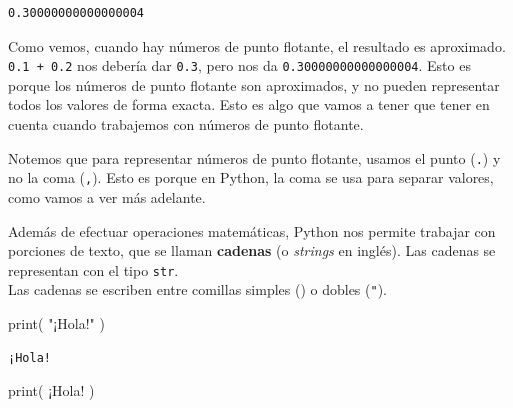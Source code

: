 \documentclass[
  letterpaper,
  DIV=11,
  numbers=noendperiod]{scrreprt}
\newenvironment{Shaded}{\begin{snugshade}}{\end{snugshade}}
\newcommand{\BuiltInTok}[1]{\textcolor[rgb]{0.00,0.23,0.31}{#1}}
\newcommand{\NormalTok}[1]{\textcolor[rgb]{0.00,0.23,0.31}{#1}}
\newcommand{\StringTok}[1]{\textcolor[rgb]{0.13,0.47,0.30}{#1}}
\begin{document}
\begin{verbatim}
0.30000000000000004
\end{verbatim}

Como vemos, cuando hay números de punto flotante, el resultado es
aproximado. \texttt{0.1\ +\ 0.2} nos debería dar \texttt{0.3}, pero nos
da \texttt{0.30000000000000004}. Esto es porque los números de punto
flotante son aproximados, y no pueden representar todos los valores de
forma exacta. Esto es algo que vamos a tener que tener en cuenta cuando
trabajemos con números de punto flotante.

\begin{tcolorbox}[enhanced jigsaw, bottomrule=.15mm, leftrule=.75mm, opacityback=0, colback=white, toprule=.15mm, bottomtitle=1mm, opacitybacktitle=0.6, rightrule=.15mm, left=2mm, arc=.35mm, coltitle=black, title=\textcolor{quarto-callout-note-color}{\faInfo}\hspace{0.5em}{Uso de punto}, breakable, toptitle=1mm, colframe=quarto-callout-note-color-frame, titlerule=0mm, colbacktitle=quarto-callout-note-color!10!white]

Notemos que para representar números de punto flotante, usamos el punto
(\texttt{.}) y no la coma (\texttt{,}). Esto es porque en Python, la
coma se usa para separar valores, como vamos a ver más adelante.

\end{tcolorbox}

Además de efectuar operaciones matemáticas, Python nos permite trabajar
con porciones de texto, que se llaman \textbf{cadenas} (o \emph{strings}
en inglés). Las cadenas se representan con el tipo \texttt{str}.\\
Las cadenas se escriben entre comillas simples
(\texttt{\textquotesingle{}}) o dobles (\texttt{"}).

\begin{Shaded}
\begin{Highlighting}[]
\BuiltInTok{print}\NormalTok{( }\StringTok{"¡Hola!"}\NormalTok{ )}
\end{Highlighting}
\end{Shaded}

\begin{verbatim}
¡Hola!
\end{verbatim}

\begin{Shaded}
\begin{Highlighting}[]
\BuiltInTok{print}\NormalTok{( }\StringTok{\textquotesingle{}¡Hola!\textquotesingle{}}\NormalTok{ )}
\end{Highlighting}
\end{Shaded}
\end{document}
